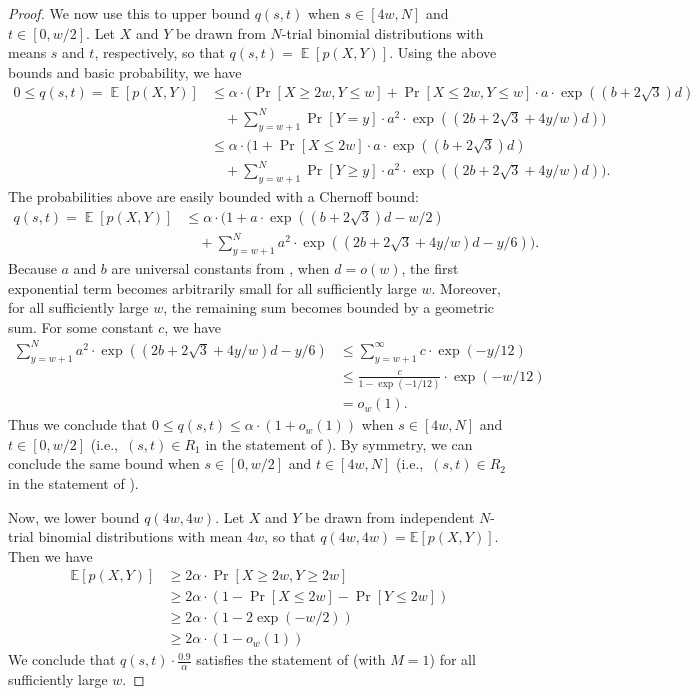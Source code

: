 \documentclass[10pt,a4paper]{article}
\newcommand{\<}{\langle}
\renewcommand{\>}{\rangle}
\DeclareMathOperator{\E}{\mathbb E}
\begin{document}
\begin{proof}
We now use this to upper bound $q(s, t)$ when $s \in [4w, N]$ and $t \in [0, w/2]$. Let $X$ and $Y$ be drawn from $N$-trial binomial distributions with means $s$ and $t$, respectively,
so that $q(s, t) = \E[p(X,Y)]$. Using the above bounds and basic probability, we have 
\begin{align}
0 \leq q(s, t) = \E[p(X,Y)] &\le \alpha \cdot \bigg( \Pr[X \ge 2w, Y \le w] + \Pr[X \le 2w, Y \le w] \cdot a \cdot \exp\left(\left(b+2\sqrt{3}\right)d\right)  \nonumber \\
& \quad + \sum_{y = w+1}^N \Pr[Y = y] \cdot a^2 \cdot \exp\left(\left(2b + 2\sqrt{3} + 4y/w\right)d\right) \bigg)\\
&\le \alpha \cdot \bigg(1 + \Pr[X \le 2w] \cdot a \cdot \exp\left(\left(b+2\sqrt{3}\right)d\right)   \nonumber \\
& \quad + \sum_{y = w+1}^N \Pr[Y \ge y] \cdot a^2 \cdot \exp\left(\left(2b + 2\sqrt{3} + 4y/w\right)d\right)\bigg).
\end{align}
The probabilities above are easily bounded with a Chernoff bound:
\begin{align}
q(s, t)=\E[p(X,Y)] &\le \alpha \cdot \bigg( 1 + a \cdot \exp\left(\left(b+2\sqrt{3}\right)d - w/2\right)  \nonumber\\
& \quad + \sum_{y = w+1}^N a^2 \cdot \exp\left(\left(2b + 2\sqrt{3} + 4y/w\right)d - y/6\right)\bigg).
\end{align}
Because $a$ and $b$ are universal constants from , when $d = o(w)$, the first exponential term becomes arbitrarily small for all sufficiently large $w$. Moreover, for all sufficiently large $w$, the remaining sum becomes bounded by a geometric sum. For some constant $c$, we have
\begin{align*}
\sum_{y = w+1}^N a^2 \cdot \exp\left(\left(2b + 2\sqrt{3} + 4y/w\right)d - y/6\right) &\le \sum_{y = w+1}^\infty c \cdot \exp\left(-y/12\right)\\
&\le \frac{c}{1 - \exp(-1/12)} \cdot \exp(-w/12)\\
&= o_w(1).
\end{align*}
Thus we conclude that $0 \le q(s, t) \le \alpha \cdot (1 + o_w(1))$ when $s \in [4w, N]$ and $t \in [0, w/2]$ (i.e.,\ $(s, t) \in R_1$ in the statement of ). By symmetry, we can conclude the same bound when $s \in [0, w/2]$ and $t \in [4w, N]$ (i.e.,\ $(s, t) \in R_2$ in the statement of ).

Now, we lower bound $q(4w, 4w)$. Let $X$ and $Y$ be drawn from independent $N$-trial binomial distributions with mean $4w$, so that $q(4w, 4w) = \mathbb{E}\left[p(X,Y)\right]$. Then we have 
\begin{align*}
\mathbb{E}\left[p(X,Y)\right] &\ge 2\alpha \cdot \Pr[X \ge 2w, Y \ge 2w]\\
&\ge 2\alpha \cdot \left(1 - \Pr[X \le 2w] - \Pr[Y \le 2w]\right)\\
&\ge 2\alpha \cdot \left(1 - 2\exp(-w/2)\right)\\
&\ge 2\alpha \cdot (1 - o_w(1))
\end{align*}
We conclude that $q(s, t) \cdot \frac{0.9}{\alpha}$ satisfies the statement of  (with $M=1$) for all sufficiently large $w$.
\end{proof}
\end{document}
